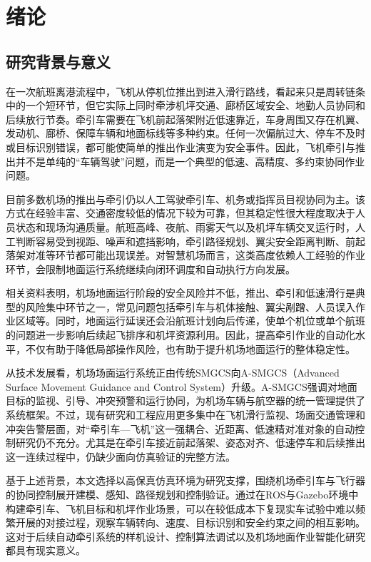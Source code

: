 

\chapter{绪论}

\section{研究背景与意义}

在一次航班离港流程中，飞机从停机位推出到进入滑行路线，看起来只是周转链条中的一个短环节，但它实际上同时牵涉机坪交通、廊桥区域安全、地勤人员协同和后续放行节奏。牵引车需要在飞机前起落架附近低速靠近，车身周围又存在机翼、发动机、廊桥、保障车辆和地面标线等多种约束。任何一次偏航过大、停车不及时或目标识别错误，都可能使简单的推出作业演变为安全事件。因此，飞机牵引与推出并不是单纯的``车辆驾驶''问题，而是一个典型的低速、高精度、多约束协同作业问题\cite{ref1,ref2}。

目前多数机场的推出与牵引仍以人工驾驶牵引车、机务或指挥员目视协同为主。该方式在经验丰富、交通密度较低的情况下较为可靠，但其稳定性很大程度取决于人员状态和现场沟通质量。航班高峰、夜航、雨雾天气以及机坪车辆交叉运行时，人工判断容易受到视距、噪声和遮挡影响，牵引路径规划、翼尖安全距离判断、前起落架对准等环节都可能出现误差。对智慧机场而言，这类高度依赖人工经验的作业环节，会限制地面运行系统继续向闭环调度和自动执行方向发展。

相关资料表明，机场地面运行阶段的安全风险并不低，推出、牵引和低速滑行是典型的风险集中环节之一，常见问题包括牵引车与机体接触、翼尖剐蹭、人员误入作业区域等。同时，地面运行延误还会沿航班计划向后传递，使单个机位或单个航班的问题进一步影响后续起飞排序和机坪资源利用。因此，提高牵引作业的自动化水平，不仅有助于降低局部操作风险，也有助于提升机场地面运行的整体稳定性\cite{ref3,ref4,ref5,ref6}。

从技术发展看，机场场面运行系统正由传统SMGCS向A-SMGCS（Advanced Surface
Movement Guidance and Control
System）升级。A-SMGCS强调对地面目标的监视、引导、冲突预警和运行协同，为机场车辆与航空器的统一管理提供了系统框架\cite{ref2,ref3,ref4}。不过，现有研究和工程应用更多集中在飞机滑行监视、场面交通管理和冲突告警层面，对``牵引车---飞机''这一强耦合、近距离、低速精对准对象的自动控制研究仍不充分。尤其是在牵引车接近前起落架、姿态对齐、低速停车和后续推出这一连续过程中，仍缺少面向仿真验证的完整方法。

基于上述背景，本文选择以高保真仿真环境为研究支撑，围绕机场牵引车与飞行器的协同控制展开建模、感知、路径规划和控制验证。通过在ROS与Gazebo环境中构建牵引车、飞机目标和机坪作业场景，可以在较低成本下复现实车试验中难以频繁开展的对接过程，观察车辆转向、速度、目标识别和安全约束之间的相互影响\cite{ref11,ref12,ref13}。这对于后续自动牵引系统的样机设计、控制算法调试以及机场地面作业智能化研究都具有现实意义。

